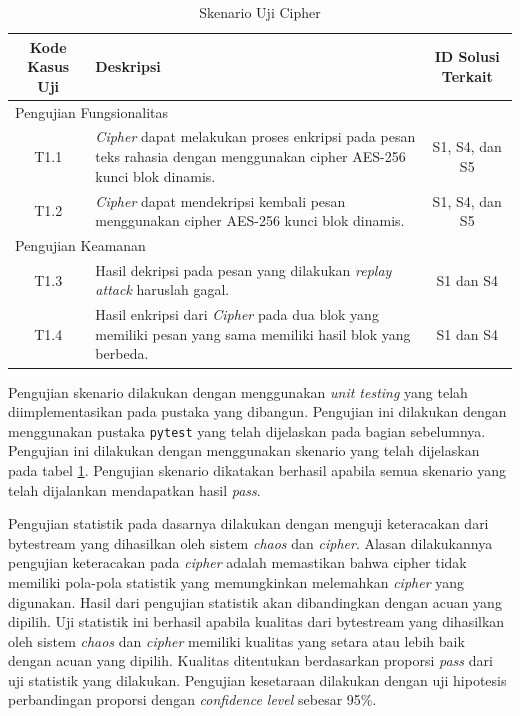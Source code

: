 \begin{table}[!h]
  \centering
  \caption{Skenario Uji Cipher} \label{tab:test.case.cipher}
  \begin{tabular}{|c|p{7cm}|c|}
    \hline
    Kode Kasus Uji & Deskripsi & ID Solusi Terkait \\ \hline
    \multicolumn{3}{|l|}{Pengujian Fungsionalitas} \\ \hline
    T1.1 & \emph{Cipher} dapat melakukan proses enkripsi pada pesan teks rahasia dengan menggunakan cipher AES-256 kunci blok dinamis.  & S1, S4, dan S5\\ \hline
    T1.2 & \emph{Cipher} dapat mendekripsi kembali pesan menggunakan cipher AES-256 kunci blok dinamis. & S1, S4, dan S5\\ \hline
    \multicolumn{3}{|l|}{Pengujian Keamanan} \\ \hline
    T1.3 & Hasil dekripsi pada pesan yang dilakukan \emph{replay attack} haruslah gagal. & S1 dan S4\\ \hline
    T1.4 & Hasil enkripsi dari \emph{Cipher} pada dua blok yang memiliki pesan yang sama memiliki hasil blok yang berbeda. & S1 dan S4\\ \hline
  \end{tabular}
\end{table}

Pengujian skenario dilakukan dengan menggunakan \emph{unit testing} yang telah diimplementasikan pada pustaka yang dibangun. Pengujian ini dilakukan dengan menggunakan pustaka \texttt{pytest} yang telah dijelaskan pada bagian sebelumnya. Pengujian ini dilakukan dengan menggunakan skenario yang telah dijelaskan pada tabel \ref{tab:test.case.cipher}. Pengujian skenario dikatakan berhasil apabila semua skenario yang telah dijalankan mendapatkan hasil \emph{pass}.

Pengujian statistik pada dasarnya dilakukan dengan menguji keteracakan dari bytestream yang dihasilkan oleh sistem \emph{chaos} dan \emph{cipher}. Alasan dilakukannya pengujian keteracakan pada \emph{cipher} adalah memastikan bahwa cipher tidak memiliki pola-pola statistik yang memungkinkan melemahkan \emph{cipher} yang digunakan. Hasil dari pengujian statistik akan dibandingkan dengan acuan yang dipilih. Uji statistik ini berhasil apabila kualitas dari bytestream yang dihasilkan oleh sistem \emph{chaos} dan \emph{cipher} memiliki kualitas yang setara atau lebih baik dengan acuan yang dipilih. Kualitas ditentukan berdasarkan proporsi \emph{pass} dari uji statistik yang dilakukan. Pengujian kesetaraan dilakukan dengan uji hipotesis perbandingan proporsi dengan \emph{confidence level} sebesar 95\%.

